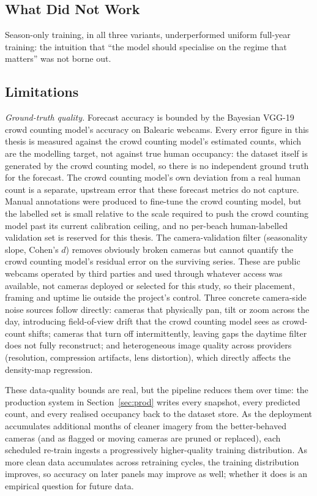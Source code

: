 \documentclass[twocolumn,twoside,a4paper,10pt]{IEEEtran}
\begin{document}
\subsection{What Did Not Work}

Season-only training, in all three variants, underperformed uniform full-year training: the intuition that ``the model should specialise on the regime that matters'' was not borne out.

\subsection{Limitations}

\textit{Ground-truth quality.} Forecast accuracy is bounded by the Bayesian VGG-19 crowd counting model's accuracy on Balearic webcams. Every error figure in this thesis is measured against the crowd counting model's estimated counts, which are the modelling target, not against true human occupancy: the dataset itself is generated by the crowd counting model, so there is no independent ground truth for the forecast. The crowd counting model's own deviation from a real human count is a separate, upstream error that these forecast metrics do not capture. Manual annotations were produced to fine-tune the crowd counting model, but the labelled set is small relative to the scale required to push the crowd counting model past its current calibration ceiling, and no per-beach human-labelled validation set is reserved for this thesis. The camera-validation filter (seasonality slope, Cohen's $d$) removes obviously broken cameras but cannot quantify the crowd counting model's residual error on the surviving series. These are public webcams operated by third parties and used through whatever access was available, not cameras deployed or selected for this study, so their placement, framing and uptime lie outside the project's control. Three concrete camera-side noise sources follow directly: cameras that physically pan, tilt or zoom across the day, introducing field-of-view drift that the crowd counting model sees as crowd-count shifts; cameras that turn off intermittently, leaving gaps the daytime filter does not fully reconstruct; and heterogeneous image quality across providers (resolution, compression artifacts, lens distortion), which directly affects the density-map regression.

These data-quality bounds are real, but the pipeline reduces them over time: the production system in Section~\ref{sec:prod} writes every snapshot, every predicted count, and every realised occupancy back to the dataset store. As the deployment accumulates additional months of cleaner imagery from the better-behaved cameras (and as flagged or moving cameras are pruned or replaced), each scheduled re-train ingests a progressively higher-quality training distribution. As more clean data accumulates across retraining cycles, the training distribution improves, so accuracy on later panels may improve as well; whether it does is an empirical question for future data.
\end{document}
